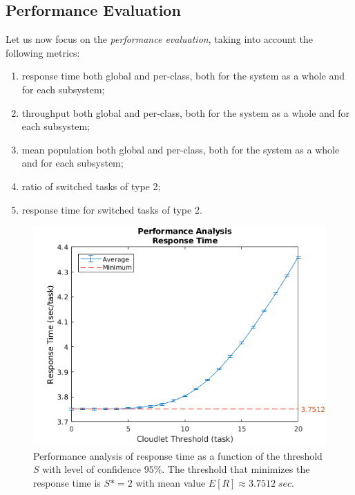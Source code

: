 \subsection{Performance Evaluation}
Let us now focus on the \textit{performance evaluation}, taking into account the following metrics:

\begin{enumerate}
	\item response time both global and per-class, both for the system as a whole and for each subsystem;
	\item throughput both global and per-class, both for the system as a whole and for each subsystem;
	\item mean population both global and per-class, both for the system as a whole and for each subsystem;
	\item ratio of switched tasks of type 2;
	\item response time for switched tasks of type 2.
\end{enumerate}

\begin{figure}
	\includegraphics[width=\columnwidth]{fig/evaluation-performance-analysis-response-time}
	\caption{Performance analysis of response time as a function of the threshold $S$ with level of confidence $95\%$. The threshold that minimizes the response time is $S*=2$ with mean value $E[R]\approx3.7512 \; sec$.}
	\label{fig:evaluation-performance-analysis-response-time}
\end{figure}

